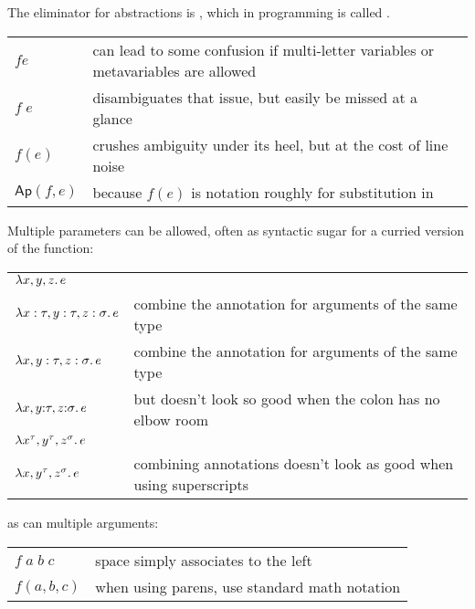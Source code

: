 \documentclass[11pt]{article} %
\theoremstyle{definition}
\theoremstyle{remark}
\begin{document}
The eliminator for abstractions is , which in programming is called .
\begin{center}
\renewcommand{\arraystretch}{1.2}
\begin{tabular}{lp{10cm}}
$fe$ & can lead to some confusion if multi-letter variables or metavariables are allowed \\
$f\;e$ & disambiguates that issue, but easily be missed at a glance \\
$f(e)$ & crushes ambiguity under its heel, but at the cost of line noise \\
$\mathsf{Ap}(f, e)$ & because $f(e)$ is notation roughly for substitution in \cite{martin-lof_1984} \\
\end{tabular}
\end{center}

Multiple parameters can be allowed, often as syntactic sugar for a curried version of the function:
\begin{center}
\renewcommand{\arraystretch}{1.2}
\begin{tabular}{lp{10cm}}
${\lambda}{x,y,z}.\,e$ \\
${\lambda}{x:\tau,y:\tau,z:\sigma}.\,e$ & combine the annotation for arguments of the same type \\
${\lambda}{x,y:\tau,z:\sigma}.\,e$ & combine the annotation for arguments of the same type \\
${\lambda}{x,y\mathord:\tau,z\mathord:\sigma}.\,e$ & but doesn't look so good when the colon has no elbow room \\
${\lambda}{x^\tau,y^\tau,z^\sigma}.\,e$ \\
${\lambda}{x,y^\tau,z^\sigma}.\,e$ & combining annotations doesn't look as good when using superscripts \\
\end{tabular}
\end{center}
as can multiple arguments:
\begin{center}
\renewcommand{\arraystretch}{1.2}
\begin{tabular}{lp{10cm}}
$f\;a\;b\;c$ & space simply associates to the left \\
$f(a, b, c)$ & when using parens, use standard math notation \\
\end{tabular}
\end{center}
\end{document}
